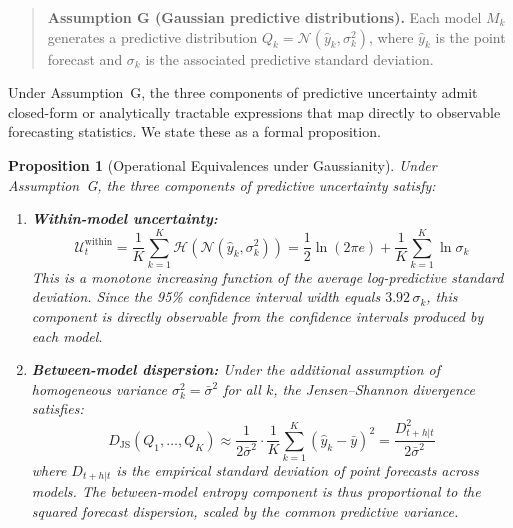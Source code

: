 \documentclass[12pt,a4paper]{article}
\newtheorem{proposition}{Proposition}
\theoremstyle{remark}
\begin{document}
\begin{quote}
\textbf{Assumption G (Gaussian predictive distributions).} Each model
$M_k$ generates a predictive distribution $Q_k = \mathcal{N}(\hat{y}_k,
\sigma_k^2)$, where $\hat{y}_k$ is the point forecast and $\sigma_k$ is
the associated predictive standard deviation.
\end{quote}

Under Assumption~G, the three components of predictive uncertainty admit closed-form
or analytically tractable expressions that map directly to observable
forecasting statistics. We state these as a formal proposition.

\begin{proposition}[Operational Equivalences under Gaussianity]
\label{prop:operational}
Under Assumption~G, the three components of predictive uncertainty satisfy:

\begin{enumerate}[label=(\roman*)]
    \item \textbf{Within-model uncertainty:}
    \begin{equation}
        \mathcal{U}^{\text{within}}_t =
        \frac{1}{K}\sum_{k=1}^{K} \mathcal{H}(\mathcal{N}(\hat{y}_k,
        \sigma_k^2)) = \frac{1}{2}\ln(2\pi e) +
        \frac{1}{K}\sum_{k=1}^{K} \ln \sigma_k
        \label{eq:within_gaussian}
    \end{equation}
    This is a monotone increasing function of the average log-predictive
    standard deviation. Since the 95\% confidence interval width equals
    $3.92\,\sigma_k$, this component is directly observable from the
    confidence intervals produced by each model.

    \item \textbf{Between-model dispersion:} Under the additional
    assumption of homogeneous variance $\sigma_k^2 = \bar{\sigma}^2$
    for all $k$, the Jensen--Shannon divergence satisfies:
    \begin{equation}
        D_{\text{JS}}(Q_1,\ldots,Q_K) \approx
        \frac{1}{2\bar{\sigma}^2} \cdot
        \frac{1}{K}\sum_{k=1}^{K}(\hat{y}_k - \bar{y})^2
        = \frac{D_{t+h|t}^2}{2\bar{\sigma}^2}
        \label{eq:between_gaussian}
    \end{equation}
    where $D_{t+h|t}$ is the empirical standard deviation of point
    forecasts across models. The
    between-model entropy component is thus proportional to the squared
    forecast dispersion, scaled by the common predictive variance.


\end{enumerate}
\end{proposition}
\end{document}
